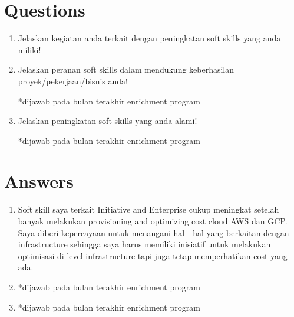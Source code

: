 \documentclass[12pt, letterpaper]{article}
\begin{document}
\section*{Questions}
\begin{enumerate}
    \item Jelaskan kegiatan anda terkait dengan peningkatan soft skills yang anda miliki!
    \item Jelaskan peranan soft skills dalam mendukung keberhasilan proyek/pekerjaan/bisnis anda!
    
    *dijawab pada bulan terakhir enrichment program
    \item Jelaskan peningkatan soft skills yang anda alami!
    
    *dijawab pada bulan terakhir enrichment program
\end{enumerate}

\section*{Answers}
\begin{enumerate}
    \item Soft skill saya terkait Initiative and Enterprise cukup meningkat setelah banyak melakukan provisioning and optimizing cost cloud AWS dan GCP. Saya diberi kepercayaan untuk menangani hal - hal yang berkaitan dengan infrastructure sehingga saya harus memiliki inisiatif untuk melakukan optimisasi di level infrastructure tapi juga tetap memperhatikan cost yang ada.
    \item *dijawab pada bulan terakhir enrichment program
    \item *dijawab pada bulan terakhir enrichment program
\end{enumerate}
\end{document}
